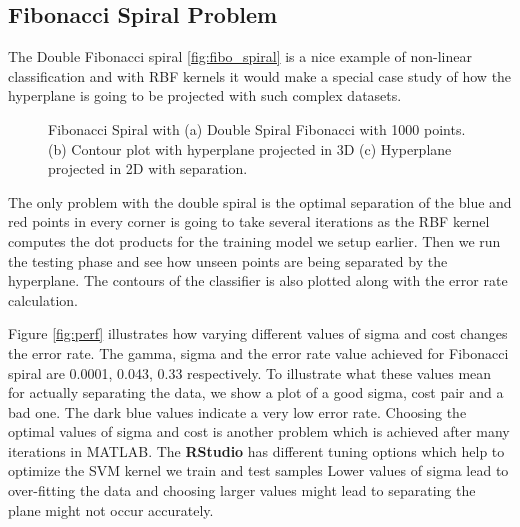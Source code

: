 \documentclass[conference]{IEEEtran}
\begin{document}
\subsection{Fibonacci Spiral Problem}
The Double Fibonacci spiral \ref{fig:fibo_spiral} is a nice example of non-linear classification and with RBF kernels it would make a special case study of how the hyperplane is going to be projected with such complex datasets.

\begin{figure}[h!]
  \centering
  	\caption{Fibonacci Spiral with
		(a) Double Spiral Fibonacci with 1000 points. 
	    (b) Contour plot with hyperplane projected in 3D
	    (c) Hyperplane projected in 2D with separation.  
    }
		\end{figure}
		
The only problem with the double spiral is the optimal separation of the blue and red points in every corner is going to take several iterations as the RBF kernel computes the dot products for the training model we setup earlier. Then we run the testing phase and see how unseen points are being separated by the hyperplane. The contours of the classifier is also plotted along with the error rate calculation.

Figure \ref{fig:perf} illustrates how varying different values of
sigma and cost changes the error rate. The gamma, sigma and the error rate value achieved for Fibonacci spiral are 0.0001, 0.043, 0.33 respectively. To illustrate what these values mean for actually separating the data, we show a plot of a good sigma, cost pair and a bad one. The dark blue values indicate a very low error rate. Choosing the optimal values of sigma and cost is another problem which is achieved after many iterations in MATLAB. The \textbf{RStudio} has different tuning options which help to optimize the SVM kernel we train and test samples
Lower values of sigma lead to over-fitting the data and choosing larger values might lead to separating the plane might not occur accurately.
\end{document}
